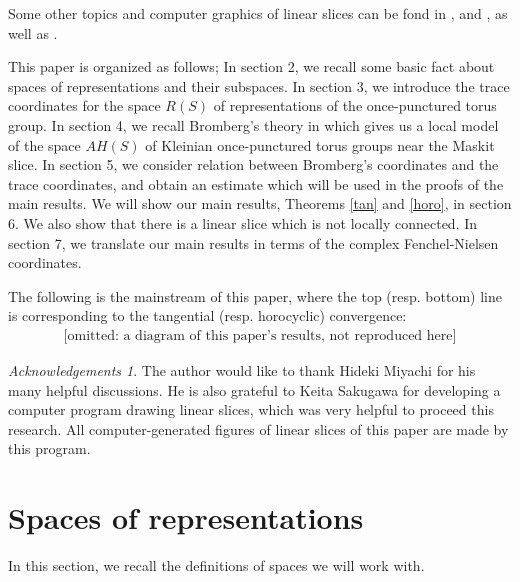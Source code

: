 \documentclass[12pt]{article}
\theoremstyle{plain}
\theoremstyle{definition}
\theoremstyle{remark}
\newtheorem*{ack}{Acknowledgements}
\begin{document}
Some other topics and computer graphics of linear slices  can be fond in 
\cite{Mc2}, \cite{MSW} and \cite{KY}, as well as \cite{PP}.  

This paper is organized as follows;
In section 2, we recall some basic fact about spaces of representations and their subspaces. 
In section 3, we introduce the trace coordinates for  the space $R(S)$ 
of representations  of the once-punctured torus group.  
In section 4, we recall Bromberg's theory in \cite{Br} which gives us a local model of the space $AH(S)$ 
of Kleinian once-punctured torus groups near the Maskit slice. 
In section 5, we consider relation between Bromberg's coordinates and the trace coordinates, 
and obtain an estimate which will be used in the proofs of the main results. 
We will show our main results, Theorems \ref{tan} and \ref{horo},  in section 6. 
We also show that there is a  linear slice 
which is not locally connected. 
In section 7, we translate our main results in terms of the complex Fenchel-Nielsen coordinates. 

The following is the mainstream of this paper,  where the top (resp. bottom) line is corresponding to the 
tangential (resp. horocyclic) convergence:  
\begin{eqnarray*}
\mbox{[omitted: a diagram of this paper's results, not reproduced here]}
\end{eqnarray*}
 

\begin{ack}
The author would like to thank Hideki Miyachi for his many helpful discussions. 
He is also grateful to Keita Sakugawa for developing a computer program drawing linear slices, 
which was very helpful to proceed this research.    All computer-generated figures of linear slices 
of this paper are made by this program. 
\end{ack}


\section{Spaces of representations}

In this section, we recall the definitions of spaces we will work with. 
\end{document}
